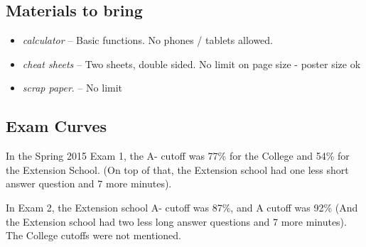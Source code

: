 \documentclass[11pt, oneside]{article}   	%
\begin{document}
\subsection{Materials to bring}
\begin{itemize}
	\item \emph{calculator} -- Basic functions. No phones / tablets allowed.
	\item \emph{cheat sheets} -- Two sheets, double sided. No limit on page size - poster size ok
	\item \emph{scrap paper}. -- No limit
\end{itemize}

\subsection{Exam Curves}
In the Spring 2015 Exam 1, the A- cutoff was 77\% for the College and 54\% for the Extension School. (On top of that, the Extension school had one less short answer question and 7 more minutes).

In Exam 2, the Extension school A- cutoff was 87\%, and A cutoff was 92\% (And the Extension school had two less long answer questions and 7 more minutes). The College cutoffs were not mentioned.
\end{document}
